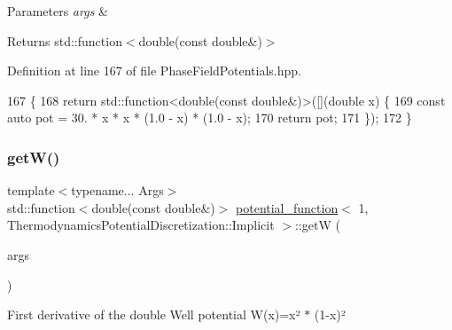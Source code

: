 \begin{DoxyParams}{Parameters}
{\em args} & \\
\hline
\end{DoxyParams}
\begin{DoxyReturn}{Returns}
std\+::function$<$double(const double\&)$>$ 
\end{DoxyReturn}


Definition at line 167 of file Phase\+Field\+Potentials.\+hpp.


\begin{DoxyCode}
167                                                         \{
168     \textcolor{keywordflow}{return} std::function<double(const double&)>([](\textcolor{keywordtype}{double} x) \{
169       \textcolor{keyword}{const} \textcolor{keyword}{auto} pot = 30. * x * x * (1.0 - x) * (1.0 - x);
170       \textcolor{keywordflow}{return} pot;
171     \});
172   \}
\end{DoxyCode}
\mbox{\label{structpotential__function_3_011_00_01ThermodynamicsPotentialDiscretization_1_1Implicit_01_4_a54faef5e6e6e4acf56b5e473c765532a}} 
\subsubsection{\texorpdfstring{get\+W()}{getW()}}
{\footnotesize\ttfamily template$<$typename... Args$>$ \\
std\+::function$<$double(const double\&)$>$ \hyperlink{structpotential__function}{potential\+\_\+function}$<$ 1, Thermodynamics\+Potential\+Discretization\+::\+Implicit $>$\+::getW (\begin{DoxyParamCaption}\item[{Args...}]{args }\end{DoxyParamCaption})\hspace{0.3cm}{\ttfamily [inline]}}



First derivative of the double Well potential W(x)=x² $\ast$ (1-\/x)² 


